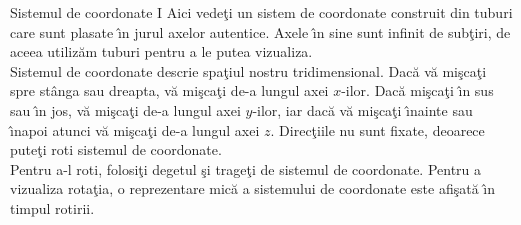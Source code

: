 \begin{surferPage}[Coordonate I]{Sistemul de coordonate I}
Aici vede\c ti un sistem de coordonate construit din tuburi care sunt plasate \^\i n jurul axelor
autentice. Axele \^\i n sine sunt infinit de sub\c tiri, de aceea utiliz\u am tuburi pentru 
a le putea vizualiza.\\
Sistemul de coordonate descrie spa\c tiul nostru tridimensional. Dac\u a v\u a mi\c sca\c ti spre st\^anga sau dreapta, v\u a mi\c sca\c ti de-a lungul axei $x$-ilor. Dac\u a mi\c sca\c ti \^\i n sus sau \^\i n jos, v\u a mi\c sca\c ti de-a lungul axei $y$-ilor, iar dac\u a v\u a mi\c sca\c ti \^\i nainte sau \^\i napoi atunci v\u a mi\c sca\c ti de-a lungul axei $z$.  Direc\c tiile nu sunt fixate, deoarece pute\c ti roti sistemul de coordonate.
\\
\vspace{0.3cm}
Pentru a-l roti, folosi\c ti degetul \c si trage\c ti de sistemul de coordonate. Pentru a vizualiza rota\c tia, o reprezentare mic\u a a sistemului de coordonate este afi\c sat\u a \^\i n timpul rotirii.
\end{surferPage}
